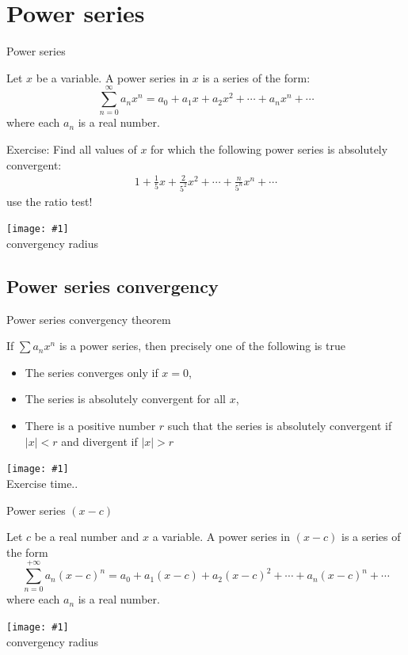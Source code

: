 \documentclass[newPxFont]{beamer}
\newcommand \imageFrame[2]{
\begingroup
\begin{frame}
  \begin{center}
\texttt{[image: \#1]}\\
\Large #2
    \end{center}
\end{frame}
\endgroup
}
\begin{document}
\section{Power series}
\begin{frame}{Power series}
\begin{theorem}
  Let $x$ be a variable. \alert{A power series in $x$} is a series of the form:
  \begin{equation}
    \sum_{n=0}^{\infty} a_n x^n=a_0+a_1 x+a_2 x^2+\cdots+a_n x^n+\cdots
  \end{equation}
  where each $a_n$ is a real number\cite{Swokowski1983}.
\end{theorem}
\end{frame}
\begin{frame}{Exercise:}
  Find all values of $x$ for which the following power series is absolutely convergent:
  \begin{eqnarray}
    1+\frac{1}{5}x+\frac{2}{5^2}x^2+\cdots+\frac{n}{5^n}x^n+\cdots
  \end{eqnarray}
  \alert{use the ratio test!}
\end{frame}
\imageFrame{geometryc}{convergency radius}
\subsection{Power series convergency}
\begin{frame}{Power series convergency theorem}
\begin{theorem}
  If $\sum a_n x^n$ is a power series, then precisely one of the following is true
  \begin{itemize}
    \item The series converges only if $x=0$,
    \item The series is absolutely convergent for all $x$,
    \item There is a positive number $r$ such that the series is absolutely convergent if $|x|<r$ and divergent if $|x|>r$
  \end{itemize}
\end{theorem}
\end{frame}
\imageFrame{exercise}{Exercise time..}
\begin{frame}{Power series $(x-c)$}
\begin{theorem}
  Let $c$ be a real number and $x$ a variable. \alert{A power series in} $(x-c)$ is a series of the form
  \begin{equation}
    \sum_{n=0}^{+\infty}a_n (x-c)^n=a_0+a_1(x-c)+a_2(x-c)^2+\cdots+a_n(x-c)^n+\cdots
  \end{equation}
  where each $a_n$ is a real number.
\end{theorem}
\end{frame}
\imageFrame{geometryc2}{convergency radius}
\end{document}
